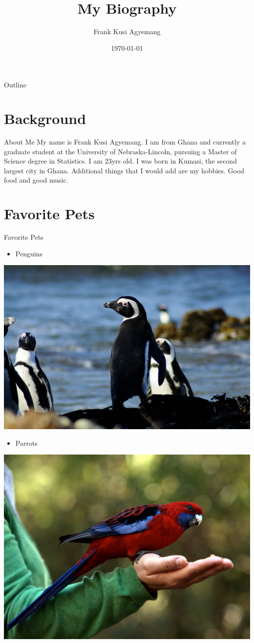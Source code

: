 \documentclass{beamer}\usepackage[]{graphicx}\usepackage[]{xcolor}
\title{My Biography}  %
\author{Frank Kusi Agyemang}                              %
\institute{University of Nebraska-Lincoln}                  %
\date{\today}                                    %
\begin{document}
\begin{frame}
  \titlepage 
\end{frame}


\begin{frame}{Outline}
  \tableofcontents 
\end{frame}

\section{Background}

\begin{frame}{About Me}
	My name is Frank Kusi Agyemang. I am from Ghana and currently a graduate student at the University of Nebraska-Lincoln, pursuing a Master of Science degree in Statistics. I am 23yrs old. I was born in Kumasi, the second largest city in Ghana. Additional things that I would add are my hobbies. Good food and good music.
\end{frame}

\section{Favorite Pets}

\begin{frame}{Favorite Pets}
\begin{itemize}
        \item Penguins
	\end{itemize}
\includegraphics[width=\textwidth]{penguin.png}
\end{frame}


\begin{frame}
\begin{itemize}
		\item Parrots
\end{itemize}
\includegraphics[width=.5\textwidth]{parrots.png}

\end{frame}
\end{document}
